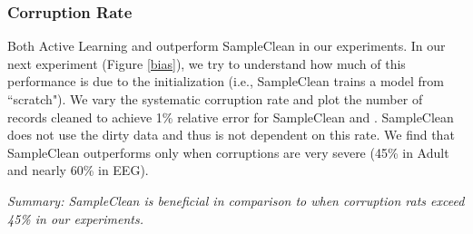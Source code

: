 \subsubsection{Corruption Rate}
Both Active Learning and \sys outperform SampleClean in our experiments.
In our next experiment (Figure \ref{bias}), we try to understand how much of this performance 
is due to the initialization (i.e., SampleClean trains a model from ``scratch").
We vary the systematic corruption rate and plot the number of records cleaned to achieve 1\% relative error for SampleClean and \sys.
SampleClean does not use the dirty data and thus is not dependent on this rate.
We find that SampleClean outperforms \sys only when corruptions are very severe (45\% in Adult and nearly 60\% in EEG). 

\vspace{0.25em}

\noindent \emph{Summary: SampleClean is beneficial in comparison to \sys when corruption rats exceed 45\% in our experiments.}

